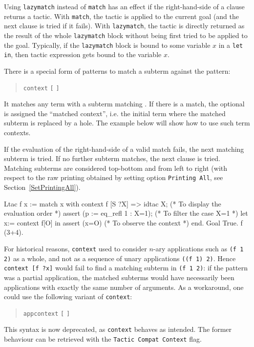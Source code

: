 \begin{Variants}

\item {}
Using {\tt lazymatch} instead of {\tt match} has an effect if the
right-hand-side of a clause returns a tactic. With {\tt match}, the
tactic is applied to the current goal (and the next clause is tried if
it fails). With {\tt lazymatch}, the tactic is directly returned as
the result of the whole {\tt lazymatch} block without being first
tried to be applied to the goal. Typically, if the {\tt lazymatch}
block is bound to some variable $x$ in a {\tt let in}, then tactic
expression gets bound to the variable $x$.

\item {}
There is a special form of patterns to match a subterm against the
pattern:
\begin{quote}
{\tt context} {\ident} {\tt [} {\cpattern} {\tt ]}
\end{quote}
It matches any term with a subterm matching {\cpattern}. If there is
a match, the optional {\ident} is assigned the ``matched context'', i.e.
the initial term where the matched subterm is replaced by a
hole. The example below will show how to use such term contexts.

If the evaluation of the right-hand-side of a valid match fails, the
next matching subterm is tried. If no further subterm matches, the
next clause is tried. Matching subterms are considered top-bottom and
from left to right (with respect to the raw printing obtained by
setting option {\tt Printing All}, see Section~\ref{SetPrintingAll}).

\begin{coq_example}
Ltac f x :=
  match x with
    context f [S ?X] => 
    idtac X;                    (* To display the evaluation order *)
    assert (p := eq_refl 1 : X=1);    (* To filter the case X=1 *)
    let x:= context f[O] in assert (x=O) (* To observe the context *)
  end.
Goal True.
f (3+4).
\end{coq_example}

\item {}
For historical reasons, {\tt context} used to consider $n$-ary applications
such as {\tt (f 1 2)} as a whole, and not as a sequence of unary
applications {\tt ((f 1) 2)}. Hence {\tt context [f ?x]} would fail
to find a matching subterm in {\tt (f 1 2)}: if the pattern was a partial
application, the matched subterms would have necessarily been
applications with exactly the same number of arguments.
As a workaround, one could use the following variant of {\tt context}:
\begin{quote}
{\tt appcontext} {\ident} {\tt [} {\cpattern} {\tt ]}
\end{quote}
This syntax is now deprecated, as {\tt context} behaves as intended. The former
behaviour can be retrieved with the {\tt Tactic Compat Context} flag.

\end{Variants}

